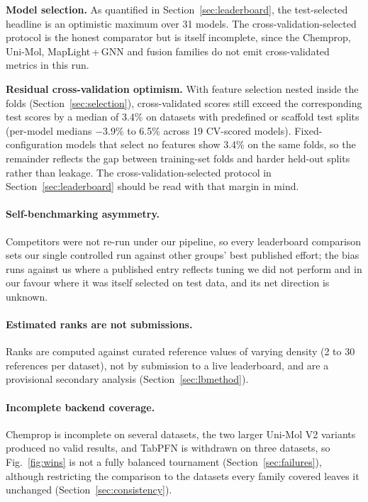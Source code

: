 \textbf{Model selection.} As quantified in Section~\ref{sec:leaderboard}, the test-selected headline is an optimistic maximum over 31 models. The cross-validation-selected protocol is the honest comparator but is itself incomplete, since the Chemprop, Uni-Mol, MapLight\,+\,GNN and fusion families do not emit cross-validated metrics in this run.

\textbf{Residual cross-validation optimism.} With feature selection nested inside the folds (Section~\ref{sec:selection}), cross-validated scores still exceed the corresponding test scores by a median of 3.4\% on datasets with predefined or scaffold test splits (per-model medians $-$3.9\% to 6.5\% across 19 CV-scored models). Fixed-configuration models that select no features show 3.4\% on the same folds, so the remainder reflects the gap between training-set folds and harder held-out splits rather than leakage. The cross-validation-selected protocol in Section~\ref{sec:leaderboard} should be read with that margin in mind.

\paragraph{Self-benchmarking asymmetry.} Competitors were not re-run under our pipeline, so every leaderboard comparison sets our single controlled run against other groups' best published effort; the bias runs against us where a published entry reflects tuning we did not perform and in our favour where it was itself selected on test data, and its net direction is unknown.

\paragraph{Estimated ranks are not submissions.} Ranks are computed against curated reference values of varying density (2 to 30 references per dataset), not by submission to a live leaderboard, and are a provisional secondary analysis (Section~\ref{sec:lbmethod}).

\paragraph{Incomplete backend coverage.} Chemprop is incomplete on several datasets, the two larger Uni-Mol V2 variants produced no valid results, and TabPFN is withdrawn on three datasets, so Fig.~\ref{fig:wins} is not a fully balanced tournament (Section~\ref{sec:failures}), although restricting the comparison to the datasets every family covered leaves it unchanged (Section~\ref{sec:consistency}).

